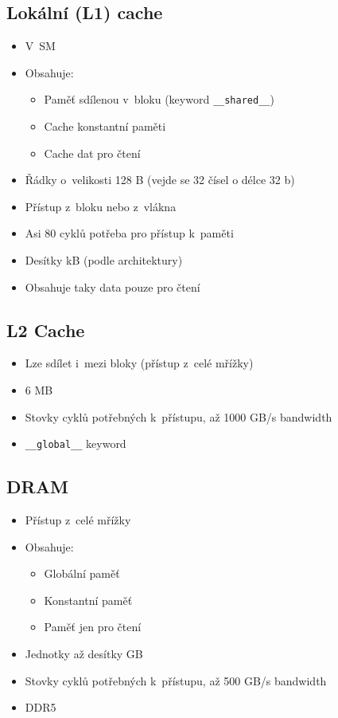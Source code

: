 \subsection{Lokální (L1) cache}
\begin{itemize}
    \item V~SM
    \item Obsahuje:
    \begin{itemize}
        \item Paměť sdílenou v~bloku (keyword \texttt{\_\_shared\_\_})
        \item Cache konstantní paměti
        \item Cache dat pro čtení
    \end{itemize}
    \item Řádky o~velikosti 128 B (vejde se 32 čísel o délce 32 b)
    \item Přístup z~bloku nebo z~vlákna
    \item Asi 80 cyklů potřeba pro přístup k~paměti
    \item Desítky kB (podle architektury)
    \item Obsahuje taky data pouze pro čtení
\end{itemize}

\subsection{L2 Cache}
\begin{itemize}
    \item Lze sdílet i~mezi bloky (přístup z~celé mřížky)
    \item 6 MB
    \item Stovky cyklů potřebných k~přístupu, až 1000 GB/s bandwidth
    \item \texttt{\_\_global\_\_} keyword
\end{itemize}

\subsection{DRAM}
\begin{itemize}
    \item Přístup z~celé mřížky
    \item Obsahuje:
    \begin{itemize}
        \item Globální paměť
        \item Konstantní paměť
        \item Paměť jen pro čtení
    \end{itemize}
    \item Jednotky až desítky GB
    \item Stovky cyklů potřebných k~přístupu, až 500 GB/s bandwidth
    \item DDR5
\end{itemize}

